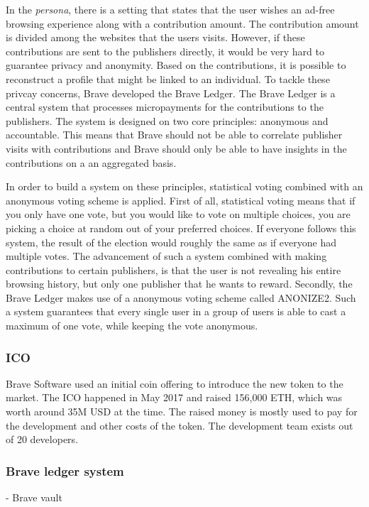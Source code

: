In the \textit{persona}, there is a setting that states that the user wishes an ad-free browsing experience along with a contribution amount. The contribution amount is divided among the websites that the users visits. However, if these contributions are sent to the publishers directly, it would be very hard to guarantee privacy and anonymity. Based on the contributions, it is possible to reconstruct a profile that might be linked to an individual. To tackle these privcay concerns, Brave developed the Brave Ledger. The Brave Ledger is a central system that processes micropayments for the contributions to the publishers. The system is designed on two core principles: anonymous and accountable. This means that Brave should not be able to correlate publisher visits with contributions and Brave should only be able to have insights in the contributions on a an aggregated basis.

In order to build a system on these principles, statistical voting combined with an anonymous voting scheme is applied. First of all, statistical voting means that if you only have one vote, but you would like to vote on multiple choices, you are picking a choice at random out of your preferred choices. If everyone follows this system, the result of the election would roughly the same as if everyone had multiple votes. The advancement of such a system combined with making contributions to certain publishers, is that the user is not revealing his entire browsing history, but only one publisher that he wants to reward. Secondly, the Brave Ledger makes use of a anonymous voting scheme called ANONIZE2. Such a system guarantees that every single user in a group of users is able to cast a maximum of one vote, while keeping the vote anonymous.   





\subsubsection{ICO}
Brave Software used an initial coin offering to introduce the new token to the market. The ICO happened in May 2017 and raised 156,000 ETH, which was worth around 35M USD at the time. The raised money is mostly used to pay for the development and other costs of the token. The development team exists out of 20 developers.

\subsubsection{Brave ledger system}

- Brave vault

\subsection{}





